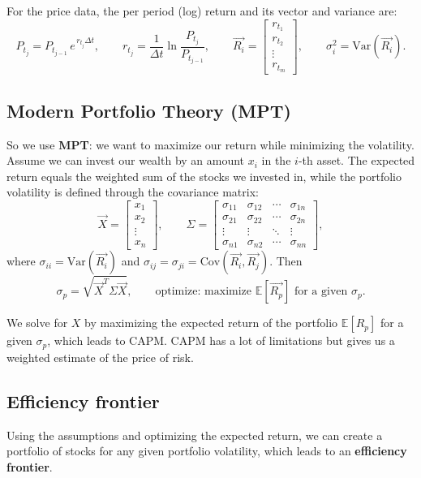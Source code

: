 \documentclass[11pt]{article}
\newcommand{\term}[1]{\textbf{\textcolor{cTerm}{#1}}}
\begin{document}
For the price data, the per period (log) return and its vector and variance are:
\[
P_{t_j} = P_{t_{j-1}}\,e^{\,r_{t_j}\Delta t},\qquad
r_{t_j} = \frac{1}{\Delta t}\ln\frac{P_{t_j}}{P_{t_{j-1}}},\qquad
\vec{R_i} = \begin{bmatrix} r_{t_1}\\ r_{t_2}\\ \vdots\\ r_{t_m}\end{bmatrix},\qquad
\sigma_i^{2} = \mathrm{Var}(\vec{R_i}).
\]

\subsection*{Modern Portfolio Theory (MPT)}
So we use \term{MPT}: we want to maximize our return while minimizing the
volatility. Assume we can invest our wealth by an amount $x_i$ in the $i$-th
asset. The expected return equals the weighted sum of the stocks we invested in,
while the portfolio volatility is defined through the covariance matrix:
\[
\vec{X} = \begin{bmatrix} x_1\\ x_2\\ \vdots\\ x_n\end{bmatrix},\qquad
\Sigma = \begin{bmatrix}
\sigma_{11} & \sigma_{12} & \cdots & \sigma_{1n}\\
\sigma_{21} & \sigma_{22} & \cdots & \sigma_{2n}\\
\vdots & \vdots & \ddots & \vdots\\
\sigma_{n1} & \sigma_{n2} & \cdots & \sigma_{nn}
\end{bmatrix},
\]
where $\sigma_{ii} = \mathrm{Var}(\vec{R_i})$ and
$\sigma_{ij} = \sigma_{ji} = \mathrm{Cov}(\vec{R_i}, \vec{R_j})$. Then
\[
\sigma_p = \sqrt{\vec{X}^{T}\Sigma\vec{X}},\qquad
\text{optimize: maximize } \mathbb{E}\!\left[\vec{R_p}\right] \text{ for a given } \sigma_p.
\]

We solve for $X$ by maximizing the expected return of the portfolio
$\mathbb{E}[R_p]$ for a given $\sigma_p$, which leads to CAPM. CAPM has a lot of
limitations but gives us a weighted estimate of the price of risk.

\subsection*{Efficiency frontier}
Using the assumptions and optimizing the expected return, we can create a
portfolio of stocks for any given portfolio volatility, which leads to an
\term{efficiency frontier}.
\end{document}
